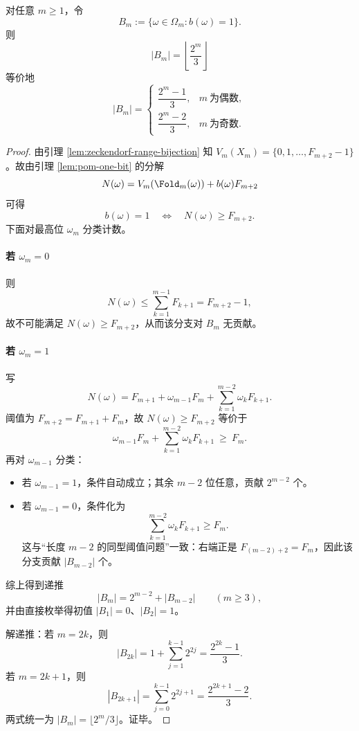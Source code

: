 \begin{theorem}[$B_m$ 的闭式计数]\label{thm:pom-hidden-bit-count}
对任意 $m\ge 1$，令
\[
B_m:=\{\omega\in\Omega_m: b(\omega)=1\}.
\]
则
$$
\boxed{\ |B_m|=\left\lfloor \frac{2^m}{3}\right\rfloor\ }
$$
等价地
$$
|B_m|=
\begin{cases}
\dfrac{2^m-1}{3}, & m\ \text{为偶数},\\[6pt]
\dfrac{2^m-2}{3}, & m\ \text{为奇数}.
\end{cases}
$$
\end{theorem}
\begin{proof}
由引理 \ref{lem:zeckendorf-range-bijection} 知 $V_m(X_m)=\{0,1,\dots,F_{m+2}-1\}$。故由引理 \ref{lem:pom-one-bit} 的分解
$$
N(\omega)=V_m(\Fold_m(\omega))+b(\omega)F_{m+2}
$$
可得
$$
b(\omega)=1\quad\Longleftrightarrow\quad N(\omega)\ge F_{m+2}.
$$
下面对最高位 $\omega_m$ 分类计数。

\paragraph{若 $\omega_m=0$}
则
$$
N(\omega)\le \sum_{k=1}^{m-1}F_{k+1}=F_{m+2}-1,
$$
故不可能满足 $N(\omega)\ge F_{m+2}$，从而该分支对 $B_m$ 无贡献。

\paragraph{若 $\omega_m=1$}
写
$$
N(\omega)=F_{m+1}+\omega_{m-1}F_m+\sum_{k=1}^{m-2}\omega_kF_{k+1}.
$$
阈值为 $F_{m+2}=F_{m+1}+F_m$，故 $N(\omega)\ge F_{m+2}$ 等价于
$$
\omega_{m-1}F_m+\sum_{k=1}^{m-2}\omega_kF_{k+1}\ \ge\ F_m.
$$
再对 $\omega_{m-1}$ 分类：
\begin{itemize}
  \item 若 $\omega_{m-1}=1$，条件自动成立；其余 $m-2$ 位任意，贡献 $2^{m-2}$ 个。
  \item 若 $\omega_{m-1}=0$，条件化为
  $$
  \sum_{k=1}^{m-2}\omega_kF_{k+1}\ge F_m.
  $$
  这与“长度 $m-2$ 的同型阈值问题”一致：右端正是 $F_{(m-2)+2}=F_m$，因此该分支贡献 $|B_{m-2}|$ 个。
\end{itemize}
综上得到递推
$$
|B_m|=2^{m-2}+|B_{m-2}|\qquad(m\ge 3),
$$
并由直接枚举得初值 $|B_1|=0$、$|B_2|=1$。

解递推：若 $m=2k$，则
$$
|B_{2k}|=1+\sum_{j=1}^{k-1}2^{2j}=\frac{2^{2k}-1}{3}.
$$
若 $m=2k+1$，则
$$
|B_{2k+1}|=\sum_{j=0}^{k-1}2^{2j+1}=\frac{2^{2k+1}-2}{3}.
$$
两式统一为 $|B_m|=\lfloor 2^m/3\rfloor$。证毕。
\end{proof}

